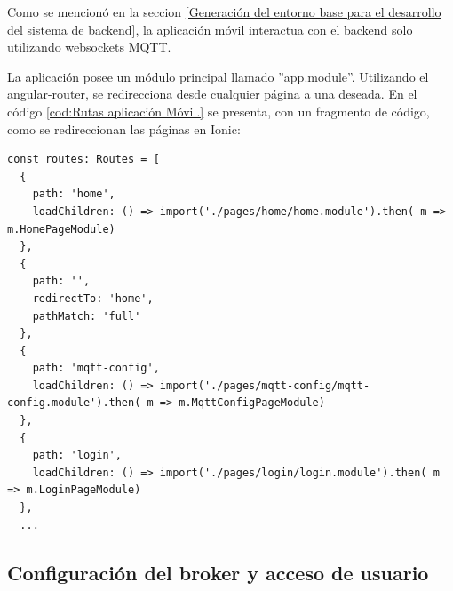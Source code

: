 Como se mencionó en la seccion \ref{Generación del entorno base para el desarrollo del sistema de backend}, la aplicación móvil interactua con el backend solo utilizando websockets MQTT.

La aplicación posee un módulo principal llamado ''app.module''. Utilizando el angular-router, se redirecciona desde cualquier página a una deseada. En el código \ref{cod:Rutas aplicación Móvil.} se presenta, con un fragmento de código, como se redireccionan las páginas en Ionic:

\begin{lstlisting}[label=cod:Rutas aplicación Móvil.,caption=  Fragmento de las rutas de la aplicación móvil]
const routes: Routes = [
  {
    path: 'home',
    loadChildren: () => import('./pages/home/home.module').then( m => m.HomePageModule)
  },
  {
    path: '',
    redirectTo: 'home',
    pathMatch: 'full'
  },
  {
    path: 'mqtt-config',
    loadChildren: () => import('./pages/mqtt-config/mqtt-config.module').then( m => m.MqttConfigPageModule)
  },
  {
    path: 'login',
    loadChildren: () => import('./pages/login/login.module').then( m => m.LoginPageModule)
  },
  ...

\end{lstlisting} 

\pagebreak

\subsection{Configuración del broker y acceso de usuario}

